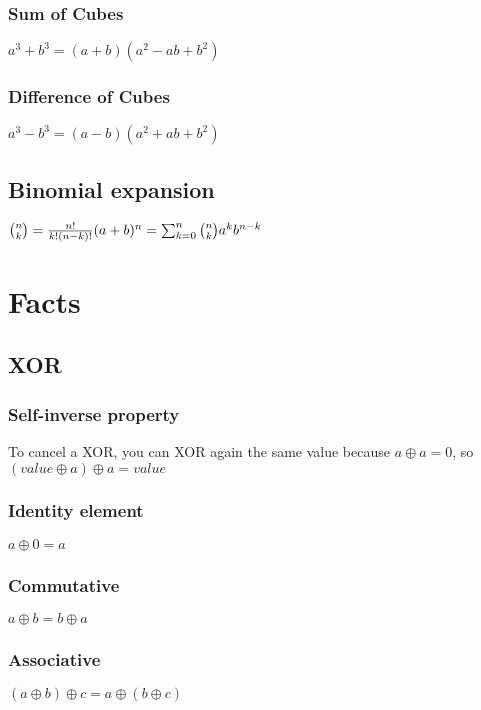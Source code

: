 \documentclass{article}
\begin{document}
\subsubsection{Sum of Cubes}
$a^3 + b^3 = (a+b)(a^2 - ab + b^2)$

\subsubsection{Difference of Cubes}
$a^3-b^3 = (a-b)(a^2 +ab + b^2)$

\subsection{Binomial expansion}
$\binom{n}{k} = \frac{n!}{k!(n-k)!}
\newline
(a+b)^n = \sum_{k=0}^{n} \binom{n}{k}a^{k}b^{n-k}$

\section{Facts}
\subsection{XOR}
\subsubsection{Self-inverse property}
To cancel a XOR, you can XOR again the same value because $a \oplus a = 0$, so $(value \oplus a) \oplus a = value$

\subsubsection{Identity element}
$a \oplus 0 = a$

\subsubsection{Commutative}
$a \oplus b = b \oplus a$

\subsubsection{Associative}
$(a \oplus b) \oplus c = a \oplus (b \oplus c)$
\end{document}
